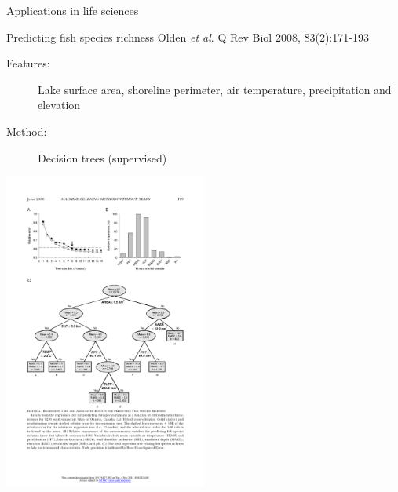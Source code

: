 \documentclass[pdf]{beamer}
\begin{document}
\begin{frame}{Applications in life sciences}
\begin{exampleblock}{Predicting fish species richness \vskip-1mm{\tiny Olden \textit{et al}. Q Rev Biol 2008, 83(2):171-193}}
\begin{description}
	\item[Features:] Lake surface area, shoreline perimeter, air temperature, precipitation and elevation
	\item[Method:] Decision trees (supervised)
\end{description}
\begin{center}
	\includegraphics[width=0.5\textwidth]{olden.pdf}
\end{center}
\end{exampleblock}
\end{frame}
\end{document}
